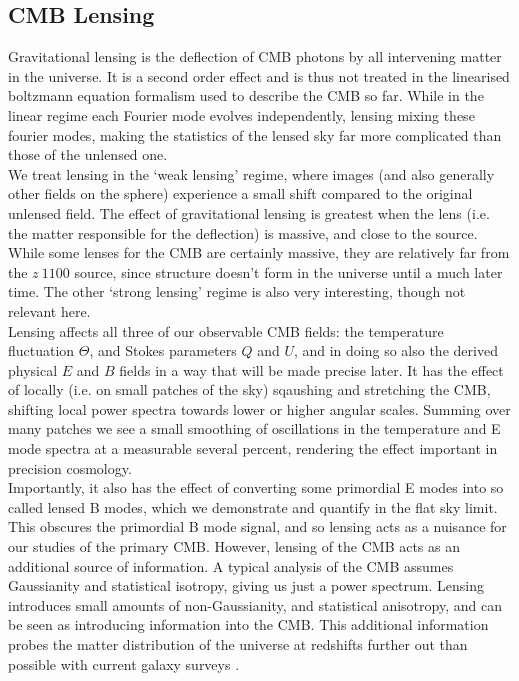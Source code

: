 \documentclass[a4paper,10pt]{article}
\begin{document}
\subsection{CMB Lensing}

Gravitational lensing is the deflection of CMB photons by all intervening matter in the universe. It is a second order effect and is thus not treated in the linearised boltzmann equation formalism used to describe the CMB so far. While in the linear regime each Fourier mode evolves independently, lensing mixing these fourier modes, making the statistics of the lensed sky far more complicated than those of the unlensed one. \\

We treat lensing in the `weak lensing' regime, where images (and also generally other fields on the sphere) experience a small shift compared to the original unlensed field. The effect of gravitational lensing is greatest when the lens (i.e. the matter responsible for the deflection) is massive, and close to the source. While some lenses for the CMB are certainly massive, they are relatively far from the $z~1100$ source, since structure doesn't form in the universe until a much later time. The other `strong lensing' regime is also very interesting, though not relevant here.\\

Lensing affects all three of our observable CMB fields: the temperature fluctuation $\Theta$, and Stokes parameters $Q$ and $U$, and in doing so also the derived physical $E$ and $B$ fields in a way that will be made precise later. It has the effect of locally (i.e. on small patches of the sky) sqaushing and stretching the CMB, shifting local power spectra towards lower or higher angular scales. Summing over many patches we see a small smoothing of oscillations in the temperature and E mode spectra at a measurable several percent, rendering the effect important in precision cosmology. \\

Importantly, it also has the effect of converting some primordial E modes into so called lensed B modes, which we demonstrate and quantify in the flat sky limit. This obscures the primordial B mode signal, and so lensing acts as a nuisance for our studies of the primary CMB. However, lensing of the CMB acts as an additional source of information. A typical analysis of the CMB assumes Gaussianity and statistical isotropy, giving us just a power spectrum. Lensing introduces small amounts of non-Gaussianity, and statistical anisotropy, and can be seen as introducing information into the CMB. This additional information probes the matter distribution of the universe at redshifts further out than possible with current galaxy surveys \cite{sloan}.
\end{document}

